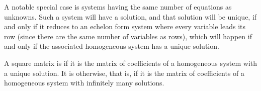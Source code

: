 A notable special case is
systems having the same number of equations as unknowns. 
Such a system will have a solution, and that solution will be unique, 
if and only if it
reduces to an echelon form system where every variable leads its row
(since there are the same number of variables as rows),
which will happen if and only if
the associated homogeneous system has a unique solution.

\begin{definition}
A square matrix is 
if it is the matrix of coefficients of a
homogeneous system with a unique solution.
It is
 otherwise,
that is,
if it is the matrix of coefficients of a homogeneous system with 
infinitely many solutions.
\end{definition}

